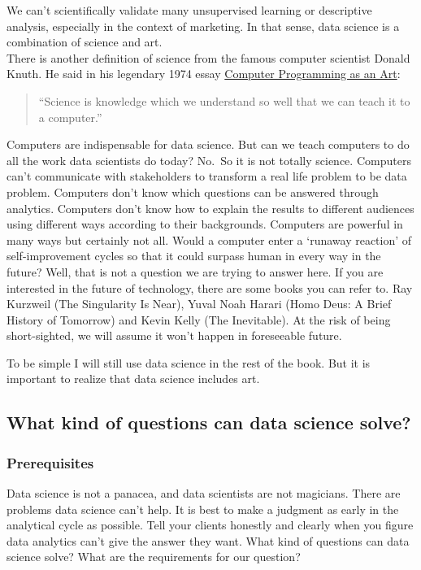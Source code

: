 \documentclass[
]{article}
\begin{document}
We can't scientifically validate many unsupervised learning or
descriptive analysis, especially in the context of marketing. In that
sense, data science is a combination of science and art.\\
There is another definition of science from the famous computer
scientist Donald Knuth. He said in his legendary 1974 essay
\href{http://www.paulgraham.com/knuth.html}{Computer Programming as an
Art}:

\begin{quote}
``Science is knowledge which we understand so well that we can teach it
to a computer.''
\end{quote}

Computers are indispensable for data science. But can we teach computers
to do all the work data scientists do today? No.~So it is not totally
science. Computers can't communicate with stakeholders to transform a
real life problem to be data problem. Computers don't know which
questions can be answered through analytics. Computers don't know how to
explain the results to different audiences using different ways
according to their backgrounds. Computers are powerful in many ways but
certainly not all. Would a computer enter a `runaway reaction' of
self-improvement cycles so that it could surpass human in every way in
the future? Well, that is not a question we are trying to answer here.
If you are interested in the future of technology, there are some books
you can refer to. Ray Kurzweil (The Singularity Is Near), Yuval Noah
Harari (Homo Deus: A Brief History of Tomorrow) and Kevin Kelly (The
Inevitable). At the risk of being short-sighted, we will assume it won't
happen in foreseeable future.

To be simple I will still use data science in the rest of the book. But
it is important to realize that data science includes art.

\hypertarget{what-kind-of-questions-can-data-science-solve}{%
\subsection{What kind of questions can data science
solve?}\label{what-kind-of-questions-can-data-science-solve}}

\hypertarget{prerequisites}{%
\subsubsection{Prerequisites}\label{prerequisites}}

Data science is not a panacea, and data scientists are not magicians.
There are problems data science can't help. It is best to make a
judgment as early in the analytical cycle as possible. Tell your clients
honestly and clearly when you figure data analytics can't give the
answer they want. What kind of questions can data science solve? What
are the requirements for our question?
\end{document}
